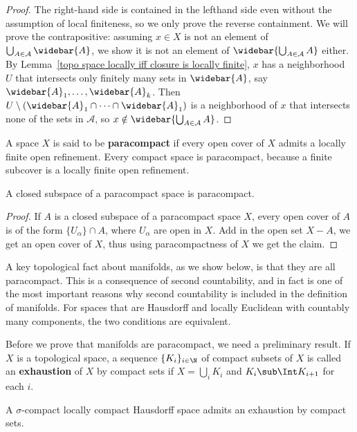 \begin{proof}
The right-hand side is contained in the lefthand side even without the assumption of local finiteness, so we only prove the reverse containment. We will prove the contrapositive: assuming $x\in X$ is not an element of $\bigcup_{A\in\mathcal{A}}\widebar{A}$, we show it is not an element of $\widebar{\bigcup_{A\in\mathcal{A}} A}$ either. By Lemma~\ref{topo space locally iff closure is locally finite},
$x$ has a neighborhood $U$ that intersects only finitely many sets in $\widebar{A}$, say $\widebar{A}_1,\dots,\widebar{A}_k$. Then $U\setminus(\widebar{A}_1\cap\cdots\cap\widebar{A}_1)$ is a neighborhood of $x$ that intersects none of the sets in $\mathcal{A}$, so $x\notin\widebar{\bigcup_{A\in\mathcal{A}} A}$.
\end{proof}
\begin{definition}
A space $X$ is said to be \textbf{paracompact} if every open cover of $X$ admits a locally finite open refinement. Every compact space is paracompact, because a finite subcover is a locally finite open refinement.
\end{definition}
\begin{proposition}
A closed subspace of a paracompact space is paracompact.
\end{proposition}
\begin{proof}
If $A$ is a closed subspace of a paracompact space $X$, every open cover of $A$ is of the form $\{U_\alpha\}\cap A$, where $U_\alpha$ are open in $X$. Add in the open set $X-A$, we get an open cover of $X$, thus using paracompactness of $X$ we get the claim.
\end{proof}
A key topological fact about manifolds, as we show below, is that they are all paracompact. This is a consequence of second countability, and in fact is one of the most important reasons why second countability is included in the definition of manifolds. For spaces that are Hausdorff and locally Euclidean with countably many components, the two conditions are equivalent.\par
Before we prove that manifolds are paracompact, we need a preliminary result. If $X$ is a topological space, a sequence $\{K_i\}_{i\in\N}$ of compact subsets of $X$ is called an \textbf{exhaustion} of $X$ by compact sets if $X=\bigcup_{i}K_i$ and $K_i\sub\Int K_{i+1}$ for each $i$.
\begin{proposition}\label{exhaustion by compact}
A $\sigma$-compact locally compact Hausdorff space admits an exhaustion by compact sets.
\end{proposition}
